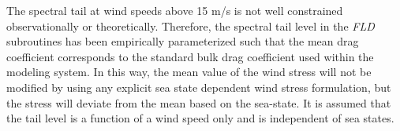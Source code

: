 The spectral tail at wind speeds above 15 m/s is not well constrained observationally or theoretically.
Therefore, the spectral tail level in the {\it FLD} subroutines has been empirically parameterized such that the mean drag coefficient corresponds to the standard bulk drag coefficient used within the modeling system.
In this way, the mean value of the wind stress will not be modified by using any explicit sea state dependent wind stress formulation, but the stress will deviate from the mean based on the sea-state.
It is assumed that the tail level is a function of a wind speed only and is independent of sea states.